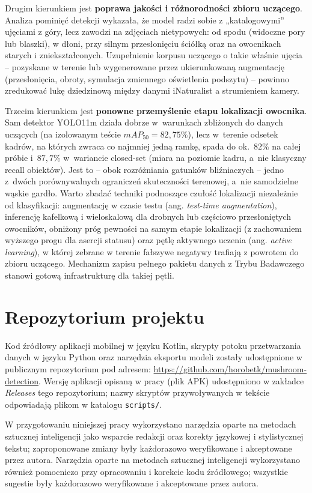 Drugim kierunkiem jest \textbf{poprawa jakości i różnorodności zbioru uczącego}. Analiza pominięć detekcji wykazała, że model radzi sobie z „katalogowymi” ujęciami z góry, lecz zawodzi na zdjęciach nietypowych: od spodu (widoczne pory lub blaszki), w dłoni, przy silnym przesłonięciu ściółką oraz na owocnikach starych i zniekształconych. Uzupełnienie korpusu uczącego o takie właśnie ujęcia -- pozyskane w terenie lub wygenerowane przez ukierunkowaną augmentację (przesłonięcia, obroty, symulacja zmiennego oświetlenia podszytu) -- powinno zredukować lukę dziedzinową między danymi iNaturalist a strumieniem kamery.

Trzecim kierunkiem jest \textbf{ponowne przemyślenie etapu lokalizacji owocnika}. Sam detektor YOLO11m działa dobrze w~warunkach zbliżonych do danych uczących (na izolowanym teście $mAP_{50}=82{,}75\%$), lecz w~terenie odsetek kadrów, na których zwraca co najmniej jedną ramkę, spada do ok.\ $82\%$ na całej próbie i~$87{,}7\%$ w~wariancie closed-set (miara na poziomie kadru, a~nie klasyczny recall obiektów). Jest to -- obok rozróżniania gatunków bliźniaczych -- jedno z~dwóch porównywalnych ograniczeń skuteczności terenowej, a~nie samodzielne wąskie gardło. Warto zbadać techniki podnoszące czułość lokalizacji niezależnie od klasyfikacji: augmentację w czasie testu (ang. \textit{test-time augmentation}), inferencję kafelkową i wieloskalową dla drobnych lub częściowo przesłoniętych owocników, obniżony próg pewności na samym etapie lokalizacji (z zachowaniem wyższego progu dla asercji statusu) oraz pętlę aktywnego uczenia (ang. \textit{active learning}), w której zebrane w terenie fałszywe negatywy trafiają z powrotem do zbioru uczącego. Mechanizm zapisu pełnego pakietu danych z Trybu Badawczego stanowi gotową infrastrukturę dla takiej pętli.

\section{Repozytorium projektu}
Kod źródłowy aplikacji mobilnej w języku Kotlin, skrypty potoku przetwarzania danych w języku Python oraz narzędzia eksportu modeli zostały udostępnione w publicznym repozytorium pod adresem: \url{https://github.com/horobetk/mushroom-detection}. Wersję aplikacji opisaną w pracy (plik APK) udostępniono w zakładce \textit{Releases} tego repozytorium; nazwy skryptów przywoływanych w tekście odpowiadają plikom w katalogu \texttt{scripts/}.

W przygotowaniu niniejszej pracy wykorzystano narzędzia oparte na metodach sztucznej inteligencji jako wsparcie redakcji oraz korekty językowej i stylistycznej tekstu; zaproponowane zmiany były każdorazowo weryfikowane i akceptowane przez autora.
Narzędzia oparte na metodach sztucznej inteligencji wykorzystano również pomocniczo przy opracowaniu i korekcie kodu źródłowego; wszystkie sugestie były każdorazowo weryfikowane i akceptowane przez autora.
